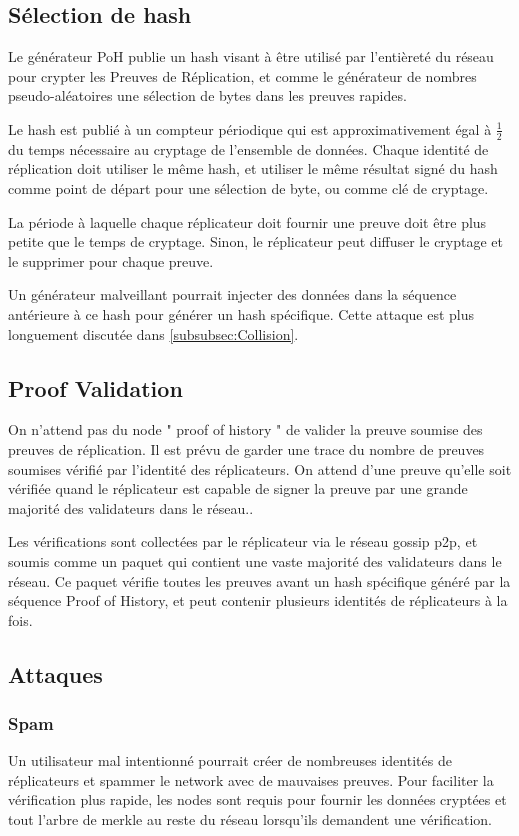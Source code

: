 \documentclass[12pt]{article}
\begin{document}
\subsection{Sélection de hash}\label{selectiondehash}

Le générateur PoH publie un hash visant à être utilisé par l’entièreté du réseau pour crypter les Preuves de Réplication, et comme le générateur de nombres pseudo-aléatoires une sélection de bytes dans les preuves rapides.

Le hash est publié à un compteur périodique qui est approximativement égal à \(\frac{1}{2}\) du temps nécessaire au cryptage de l’ensemble de données. Chaque identité de réplication doit utiliser le même hash, et utiliser le même résultat signé du hash comme point de départ pour une sélection de byte, ou comme clé de cryptage.

La période à laquelle chaque réplicateur doit fournir une preuve doit être plus petite que le temps de cryptage. Sinon, le réplicateur peut diffuser le cryptage et le supprimer pour chaque preuve.

Un générateur malveillant pourrait injecter des données dans la séquence antérieure à ce hash pour générer un hash spécifique. Cette attaque est plus longuement discutée dans \ref{subsubsec:Collision}.

\subsection{Proof Validation}
On n’attend pas du node " proof of history " de valider la preuve soumise des preuves de réplication. Il est prévu de garder une trace du nombre de preuves soumises vérifié par l'identité des réplicateurs. On attend d’une preuve qu’elle soit vérifiée quand le réplicateur est capable de signer la preuve par une grande majorité des validateurs dans le réseau..

Les vérifications sont collectées par le réplicateur via le réseau gossip p2p, et soumis comme un paquet qui contient une vaste majorité des validateurs dans le réseau. Ce paquet vérifie toutes les preuves avant un hash spécifique généré par la séquence Proof of History, et peut contenir plusieurs identités de réplicateurs à la fois.
\subsection{Attaques}
\subsubsection{Spam}
Un utilisateur mal intentionné pourrait créer de nombreuses identités de réplicateurs et spammer le network avec de mauvaises preuves. Pour faciliter la vérification plus rapide, les nodes sont requis pour fournir les données cryptées et tout l'arbre de merkle au reste du réseau lorsqu'ils demandent une vérification.
\end{document}
